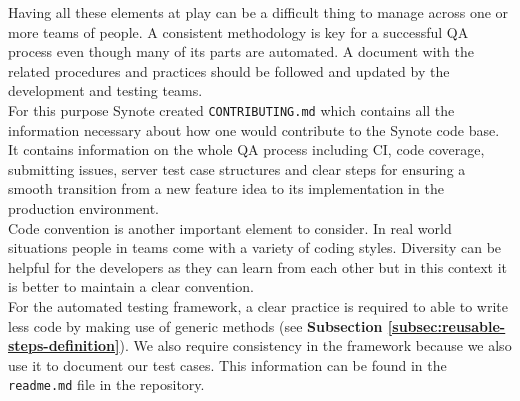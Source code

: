 Having all these elements at play can be a difficult thing to manage across one or more teams of people. A consistent methodology is key for a successful QA process even though many of its parts are automated. A document with the related procedures and practices should be followed and updated by the development and testing teams.
\\

For this purpose Synote created \texttt{CONTRIBUTING.md} which contains all the information necessary about how one would contribute to the Synote code base. It contains information on the whole QA process including CI, code coverage, submitting issues, server test case structures and clear steps for ensuring a smooth transition from a new feature idea to its implementation in the production environment.
\\

Code convention is another important element to consider. In real world situations people in teams come with a variety of coding styles. Diversity can be helpful for the developers as they can learn from each other but in this context it is better to maintain a clear convention.
\\

For the automated testing framework, a clear practice is required to able to write less code by making use of generic methods (see \textbf{Subsection \ref{subsec:reusable-steps-definition}}). We also require consistency in the framework because we also use it to document our test cases. This information can be found in the \texttt{readme.md} file in the repository.
\\
